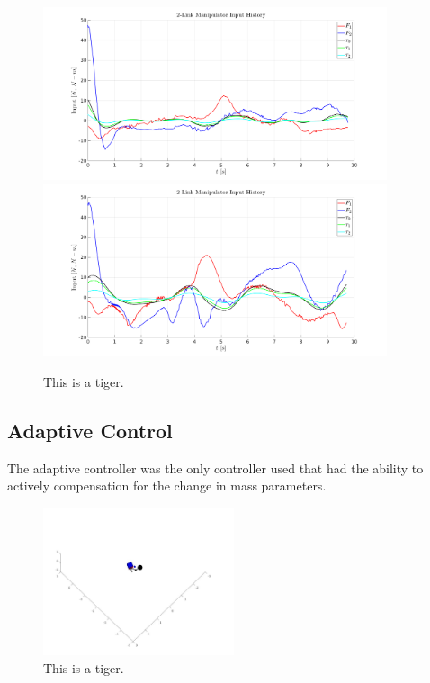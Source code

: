 \documentclass[letterpaper, 10 pt, conference]{ieeeconf}  %
\begin{document}
\begin{figure}[]
	\centering
	\includegraphics[width=0.9\textwidth]{fl_u_1.png}
	\includegraphics[width=0.9\textwidth]{fl_u_2.png}
	\caption{This is a tiger.}
\end{figure}

\subsection{Adaptive Control}

The adaptive controller was the only controller used that had the ability to actively compensation for the change in mass parameters.

\begin{figure}[htb!]
	\centering
	\includegraphics[width=0.5\textwidth]{visual.jpg}
	\caption{This is a tiger.}
\end{figure}
\end{document}
